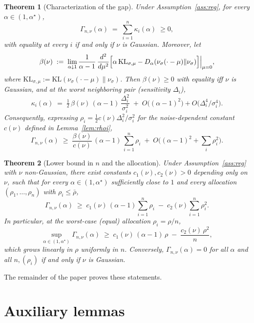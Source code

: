 \documentclass[11pt]{article}
\newtheorem{theorem}{Theorem}
\theoremstyle{definition}
\newcommand{\KL}{\mathrm{KL}}
\begin{document}
\begin{theorem}[Characterization of the gap]\label{thm:main}
Under Assumption~\ref{ass:reg}, for every $\alpha\in(1,\alpha^\star)$,
\[
\Gamma_{n,\nu}(\alpha)\;=\;\sum_{i=1}^n\kappa_i(\alpha)\;\ge 0,
\]
with equality at every $i$ if and only if $\nu$ is Gaussian. Moreover, let
\[
\beta(\nu)\;:=\;\lim_{\alpha\downarrow 1}\frac{1}{\alpha-1}\,\frac{d^2}{d\mu^2}\Bigl[\alpha\,\KL_{\sigma,\mu}-D_\alpha(\nu_\sigma(\cdot-\mu)\|\nu_\sigma)\Bigr]\Big|_{\mu=0},
\]
where $\KL_{\sigma,\mu}:=\KL(\nu_\sigma(\cdot-\mu)\|\nu_\sigma)$. Then $\beta(\nu)\ge 0$ with equality iff $\nu$ is Gaussian, and at the worst neighboring pair (sensitivity $\Delta_i$),
\[
\kappa_i(\alpha)\;=\;\tfrac12\,\beta(\nu)\,(\alpha-1)\,\frac{\Delta_i^2}{\sigma_i^2}\;+\;O\!\bigl((\alpha-1)^2\bigr)+O\!\bigl(\Delta_i^4/\sigma_i^4\bigr).
\]
Consequently, expressing $\rho_i=\tfrac12 c(\nu)\Delta_i^2/\sigma_i^2$ for the noise-dependent constant $c(\nu)$ defined in Lemma~\ref{lem:rhoi},
\[
\boxed{\;\Gamma_{n,\nu}(\alpha)\;\ge\;\frac{\beta(\nu)}{c(\nu)}\,(\alpha-1)\,\sum_{i=1}^n\rho_i\;+\;O\bigl((\alpha-1)^2+\textstyle\sum_i\rho_i^2\bigr).\;}
\]
\end{theorem}

\begin{theorem}[Lower bound in $n$ and the allocation]\label{thm:lower}
Under Assumption~\ref{ass:reg} with $\nu$ non-Gaussian, there exist constants $c_1(\nu),c_2(\nu)>0$ depending only on $\nu$, such that for every $\alpha\in(1,\alpha^\star)$ sufficiently close to $1$ and every allocation $(\rho_1,\dots,\rho_n)$ with $\rho_i\le\bar\rho$,
\[
\Gamma_{n,\nu}(\alpha)\;\ge\;c_1(\nu)\,(\alpha-1)\sum_{i=1}^n\rho_i\;-\;c_2(\nu)\sum_{i=1}^n\rho_i^2.
\]
In particular, at the worst-case (equal) allocation $\rho_i=\rho/n$,
\[
\sup_{\alpha\in(1,\alpha^\star)}\Gamma_{n,\nu}(\alpha)\;\ge\;c_1(\nu)\,(\alpha-1)\,\rho\;-\;\frac{c_2(\nu)\,\rho^2}{n},
\]
which grows linearly in $\rho$ uniformly in $n$. Conversely, $\Gamma_{n,\nu}(\alpha)=0$ for all $\alpha$ and all $n,(\rho_i)$ if and only if $\nu$ is Gaussian.
\end{theorem}

The remainder of the paper proves these statements.

\section{Auxiliary lemmas}
\end{document}
